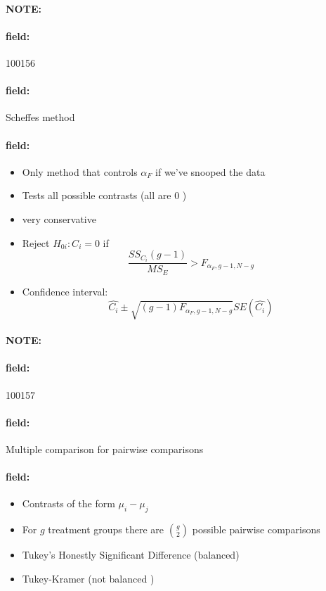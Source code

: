 \documentclass[12pt]{article}
\newenvironment{note}{\paragraph{NOTE:}}{}
\newenvironment{field}{\paragraph{field:}}{}
\begin{document}
\begin{note}
    \begin{field}
        \tiny 100156
    \end{field}
    \begin{field}
        Scheffes method
    \end{field}
    \begin{field}
        \begin{itemize}
          \item Only method that controls $\alpha_F$ if we've snooped the data
          \item Tests all possible contrasts (all are 0 )
          \item very conservative
          \item Reject $H_{0i}: C_i = 0$ if $$\frac{SS_{C_i}(g-1)}{MS_E} > F_{\alpha_F, g-1, N-g} $$
          \item Confidence interval: $$\hat{C_i} \pm \sqrt{(g-1)F_{\alpha_F, g-1, N-g}}SE(\hat{C_i}) $$
        \end{itemize}
    \end{field}
\end{note}

\begin{note}
    \begin{field}
        \tiny 100157
    \end{field}
    \begin{field}
        Multiple comparison for pairwise comparisons
    \end{field}
    \begin{field}
        \begin{itemize}
          \item Contrasts of the form $\mu_i - \mu_j$
          \item For $g$ treatment groups there are $\binom{g}{2}$ possible pairwise comparisons
          \item Tukey's Honestly Significant Difference (balanced)
          \item Tukey-Kramer (not balanced )
        \end{itemize}
    \end{field}
\end{note}
\end{document}
